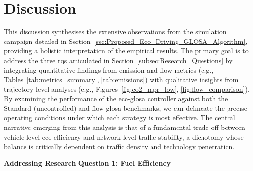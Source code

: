 \section{Discussion}
\label{sec:Results_Discussion}

This discussion synthesises the extensive observations from the simulation campaign detailed in Section~\ref{sec:Proposed_Eco_Driving_GLOSA_Algorithm}, providing a holistic interpretation of the empirical results. The primary goal is to address the three \acp{rq} articulated in Section~\ref{subsec:Research_Questions} by integrating quantitative findings from emission and flow metrics (e.g., Tables~\ref{tab:metrics_summary}, \ref{tab:emissions}) with qualitative insights from trajectory-level analyses (e.g., Figures~\ref{fig:co2_mpr_low}, \ref{fig:flow_comparison}). By examining the performance of the \ac{eco-glosa} controller against both the Standard (uncontrolled) and \ac{flow-glosa} benchmarks, we can delineate the precise operating conditions under which each strategy is most effective. The central narrative emerging from this analysis is that of a fundamental trade-off between vehicle-level eco-efficiency and network-level traffic stability, a dichotomy whose balance is critically dependent on traffic density and technology penetration.

\bigskip
\textbf{Addressing Research Question 1: Fuel Efficiency}

